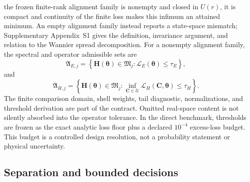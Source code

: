 \documentclass[preprint,12pt]{elsarticle}
\begin{document}
the frozen finite-rank alignment family is nonempty and closed in $U(r)$, it is
compact and continuity of the finite loss makes this infimum an attained
minimum. An empty alignment family instead reports a state-space mismatch;
Supplementary
Appendix~S1 gives the definition, invariance argument, and relation to the
Wannier spread decomposition. For a nonempty alignment family, the spectral
and operator admissible sets are
\begin{equation}
 \mathfrak{A}_{E,j}
 =\left\{
 \bm{H}(\bm{\theta})\in\mathfrak{M}_j:
 \mathcal{L}_E(\bm{\theta})\leq\tau_E
 \right\},
 \label{eq:spectral-set}
\end{equation}
and
\begin{equation}
 \mathfrak{A}_{H,j}
 =\left\{
 \bm{H}(\bm{\theta})\in\mathfrak{M}_j:
 \inf_{\bm{C}\in\mathcal{U}}
 \mathcal{L}_H(\bm{C},\bm{\theta})\leq\tau_H
 \right\}.
 \label{eq:operator-set}
\end{equation}
The finite comparison domain, shell weights, tail diagnostic, normalizations,
and threshold derivation are part of the contract. Omitted real-space content
is not silently absorbed into the operator tolerance. In the direct benchmark,
thresholds are frozen as the exact analytic loss floor plus a declared
$10^{-4}$ excess-loss budget. This budget is a controlled design resolution,
not a probability statement or physical uncertainty.

\subsection{Separation and bounded decisions}
\label{sec:bounded-decisions}
\end{document}
